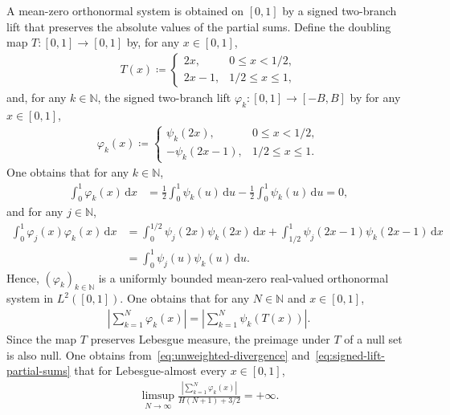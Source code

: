 \documentclass[12pt,reqno]{amsart}
\theoremstyle{definition}
\theoremstyle{plain}
\begin{document}
A mean-zero orthonormal system is obtained on $[0,1]$ by a signed two-branch lift that preserves the absolute values of the partial sums. Define the doubling map $T:[0,1]\to[0,1]$ by, for any $x\in[0,1]$,
\begin{align*}
    T(x)
    \coloneqq
    \begin{cases}
        2x, & 0\leq x<1/2,\\
        2x-1, & 1/2\leq x\leq1,
    \end{cases}
\end{align*}
and, for any $k\in\mathbb{N}$, the signed two-branch lift $\varphi_k:[0,1]\to[-B,B]$ by for any $x\in[0,1]$, 
\begin{align*}
    \varphi_k(x)
    \coloneqq
    \begin{cases}
        \psi_k(2x), & 0\leq x<1/2,\\
        -\psi_k(2x-1), & 1/2\leq x\leq1.
    \end{cases}
\end{align*}
One obtains that for any $k\in\mathbb{N}$,
\begin{align*}
    \int_0^1\varphi_k(x)\,\mathrm dx
    &=
    \frac12\int_0^1\psi_k(u)\,\mathrm du
    -
    \frac12\int_0^1\psi_k(u)\,\mathrm du
    =0,
\end{align*}
and for any $j\in\mathbb{N}$,
\begin{align*}
    \int_0^1\varphi_j(x)\varphi_k(x)\,\mathrm dx
    &=
    \int_0^{1/2}\psi_j(2x)\psi_k(2x)\,\mathrm dx
    +
    \int_{1/2}^1\psi_j(2x-1)\psi_k(2x-1)\,\mathrm dx \\
     &=\int_0^1\psi_j(u)\psi_k(u)\,\mathrm du.
\end{align*}
Hence, $(\varphi_k)_{k\in\mathbb{N}}$ is a uniformly bounded mean-zero real-valued orthonormal system in $L^2([0,1])$. One obtains that for any $N\in\mathbb{N}$ and $x\in[0,1]$,
\begin{align}
\label{eq:signed-lift-partial-sums}
    \left|
        \sum_{k=1}^N\varphi_k(x)
    \right|
    =
    \left|
        \sum_{k=1}^N\psi_k(T(x))
    \right|.
\end{align}
Since the map $T$ preserves Lebesgue measure, the preimage under $T$ of a null set is also null. One obtains from~\eqref{eq:unweighted-divergence} and~\eqref{eq:signed-lift-partial-sums} that for Lebesgue-almost every $x\in[0,1]$,
\begin{align}
\label{eq:signed-lift-divergence}
    \limsup_{N\to\infty}
    \frac{
        \left|\sum_{k=1}^{N}\varphi_k(x)\right|
    }{
        H(N+1)+3/2
    }
    =+\infty.
\end{align}
\end{document}
